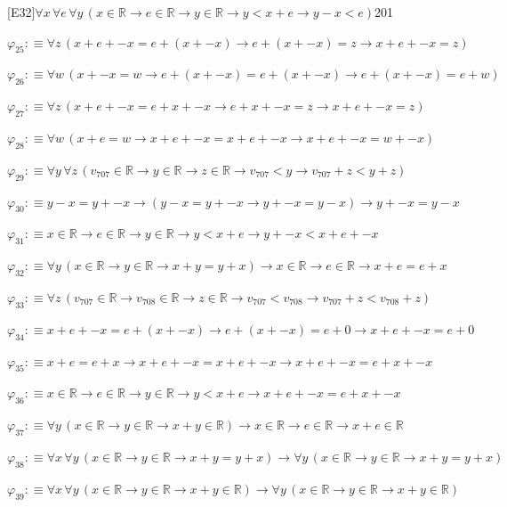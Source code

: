 \begin{fullproof}{[E32]}{$\forall x\,\forall e\,\forall y\,(x \in \mathbb{R} \to e \in \mathbb{R} \to y \in \mathbb{R} \to y < x + e \to y - x < e)$}{201}
\begin{abbrevlist}
\item $\varphi_{25} :\equiv \forall z\,(x + e + -x = e + (x + -x) \to e + (x + -x) = z \to x + e + -x = z)$
\item $\varphi_{26} :\equiv \forall w\,(x + -x = w \to e + (x + -x) = e + (x + -x) \to e + (x + -x) = e + w)$
\item $\varphi_{27} :\equiv \forall z\,(x + e + -x = e + x + -x \to e + x + -x = z \to x + e + -x = z)$
\item $\varphi_{28} :\equiv \forall w\,(x + e = w \to x + e + -x = x + e + -x \to x + e + -x = w + -x)$
\item $\varphi_{29} :\equiv \forall y\,\forall z\,(v_{707} \in \mathbb{R} \to y \in \mathbb{R} \to z \in \mathbb{R} \to v_{707} < y \to v_{707} + z < y + z)$
\item $\varphi_{30} :\equiv y - x = y + -x \to (y - x = y + -x \to y + -x = y - x) \to y + -x = y - x$
\item $\varphi_{31} :\equiv x \in \mathbb{R} \to e \in \mathbb{R} \to y \in \mathbb{R} \to y < x + e \to y + -x < x + e + -x$
\item $\varphi_{32} :\equiv \forall y\,(x \in \mathbb{R} \to y \in \mathbb{R} \to x + y = y + x) \to x \in \mathbb{R} \to e \in \mathbb{R} \to x + e = e + x$
\item $\varphi_{33} :\equiv \forall z\,(v_{707} \in \mathbb{R} \to v_{708} \in \mathbb{R} \to z \in \mathbb{R} \to v_{707} < v_{708} \to v_{707} + z < v_{708} + z)$
\item $\varphi_{34} :\equiv x + e + -x = e + (x + -x) \to e + (x + -x) = e + 0 \to x + e + -x = e + 0$
\item $\varphi_{35} :\equiv x + e = e + x \to x + e + -x = x + e + -x \to x + e + -x = e + x + -x$
\item $\varphi_{36} :\equiv x \in \mathbb{R} \to e \in \mathbb{R} \to y \in \mathbb{R} \to y < x + e \to x + e + -x = e + x + -x$
\item $\varphi_{37} :\equiv \forall y\,(x \in \mathbb{R} \to y \in \mathbb{R} \to x + y \in \mathbb{R}) \to x \in \mathbb{R} \to e \in \mathbb{R} \to x + e \in \mathbb{R}$
\item $\varphi_{38} :\equiv \forall x\,\forall y\,(x \in \mathbb{R} \to y \in \mathbb{R} \to x + y = y + x) \to \forall y\,(x \in \mathbb{R} \to y \in \mathbb{R} \to x + y = y + x)$
\item $\varphi_{39} :\equiv \forall x\,\forall y\,(x \in \mathbb{R} \to y \in \mathbb{R} \to x + y \in \mathbb{R}) \to \forall y\,(x \in \mathbb{R} \to y \in \mathbb{R} \to x + y \in \mathbb{R})$

\end{abbrevlist}
\end{fullproof}
